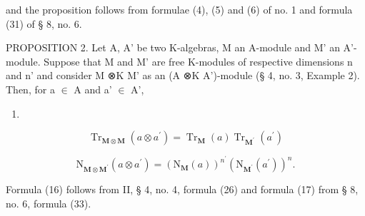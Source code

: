 and the proposition follows from formulae (4), (5) and (6) of no. 1 and formula (31) of § 8, no. 6.

PROPOSITION 2. Let A, A' be two K-algebras, M an A-module and M' an A'-module. Suppose that M and M' are free K-modules of respective dimensions n and n' and consider M ⊗K M' as an (A ⊗K A')-module (§ 4, no. 3, Example 2). Then, for a \ensuremath{\in} A and a' \ensuremath{\in} A',

\begin{enumerate}
\def\labelenumi{(\arabic{enumi})}
\setcounter{enumi}{15}
\tightlist
\item
\end{enumerate}

\[
\operatorname{Tr} _ {\mathbf {M} \otimes \mathbf {M}} (a \otimes a ^ {\prime}) = \operatorname{Tr} _ {\mathbf {M}} (a) \operatorname{Tr} _ {\mathbf {M} ^ {\prime}} (a ^ {\prime})\tag{17}
\]

\[
\mathrm{N} _ {\mathbf {M} \otimes \mathbf {M} ^ {\prime}} (a \otimes a ^ {\prime}) = (\mathrm{N} _ {\mathbf {M}} (a)) ^ {n ^ {\prime}} (\mathrm{N} _ {\mathbf {M} ^ {\prime}} (a ^ {\prime})) ^ {n}.
\]

Formula (16) follows from II, § 4, no. 4, formula (26) and formula (17) from § 8, no. 6, formula (33).

